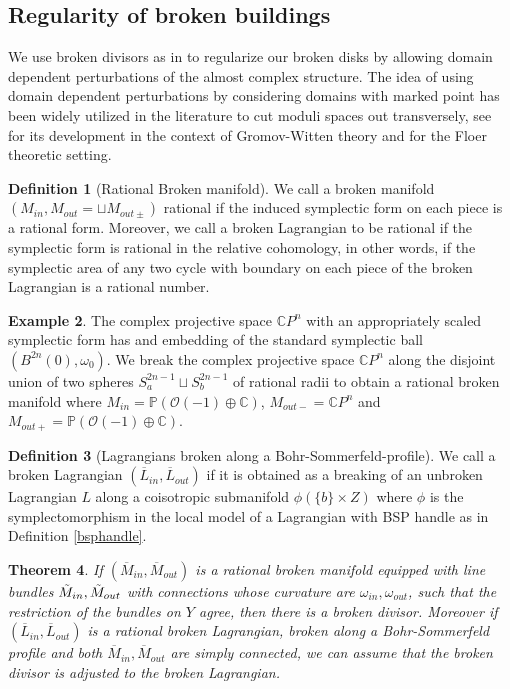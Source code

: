 \documentclass[11pt, oneside,dvipsnames]{amsart}
\newcommand{\<}{\langle}
\renewcommand{\>}{\rangle}
\newcommand{\inn}{{in}}
\newcommand{\out}{{out}}
\newcommand{\outp}{{out+}}
\newcommand{\outm}{{out-}}
\newcommand{\bC}{\mathbb{C}}
\newcommand{\bP}{\mathbb{P}}
\newcommand{\cO}{\mathcal{O}}
\newtheorem{Theorem}{Theorem}[section]
\theoremstyle{definition}
\theoremstyle{definition}
\newtheorem{defn}[Theorem]{Definition}
\newtheorem{example}[Theorem]{Example}
\numberwithin{equation}{subsection}
\begin{document}
\subsection{Regularity of broken buildings}\label{sub:reg}


We use broken divisors as in \cite{floflip} to regularize our broken disks by allowing domain dependent perturbations of the almost complex structure. The idea of using domain dependent perturbations by considering domains with marked point has been widely utilized in the literature to cut moduli spaces out transversely, see  \cite{cm07} for its development in the context of Gromov-Witten theory and \cite{cwstab} for the Floer theoretic setting.


\begin{defn}[Rational Broken manifold]
We call a broken manifold $(M_\inn,  M_\out = \sqcup M_{out\pm})$ rational if the induced symplectic form on each piece is a rational form.
Moreover, we call a broken Lagrangian to be rational if the symplectic form is rational in the relative cohomology, in other words, if the
symplectic area of any two cycle with boundary on each piece of the broken Lagrangian is a rational number.
\end{defn}

\begin{example}
    The complex projective space $\bC P^n$ with an appropriately scaled symplectic form has and embedding of the standard symplectic ball $(B^{2n}(0),\omega_0)$.
    We break the complex projective space $\bC P^n$ along the disjoint union of two spheres $S_a^{2n-1} \sqcup S_b^{2n-1}$ of rational radii to obtain 
    a rational broken manifold where $M_\inn = \bP(\cO(-1)\oplus \bC)$, $M_\outm = \bC P^n $ and $ M_\outp = \bP(\cO(-1)\oplus \bC)$.

\end{example}


\begin{defn}[Lagrangians broken along a Bohr-Sommerfeld-profile]
    We call a broken Lagrangian $(\overline{L}_\inn, \overline{L}_\out)$ if it is obtained as a breaking of an unbroken Lagrangian $L$ along a coisotropic submanifold $\phi( \{b\} \times Z)$ where $\phi$ is the symplectomorphism in the local model of a Lagrangian with BSP handle as in Definition \ref{bsphandle}.
\end{defn}


\begin{Theorem}\label{brokdiv}
If $(\overline{M}_\inn,\overline{M}_\out)$ is a rational broken manifold equipped with line bundles $\Tilde{M}_\inn,\Tilde{M}_\out$ with connections whose curvature are $\omega_\inn, \omega_\out$, such that the restriction of the bundles on $Y$ agree, then there is a broken divisor. Moreover if $(\overline{L}_\inn,\overline{L}_\out)$ is a rational broken 
Lagrangian, broken along a Bohr-Sommerfeld profile and both $\overline{M}_\inn,\overline{M}_\out$ are simply connected, we can assume that the broken divisor is adjusted to the broken Lagrangian.
\end{Theorem}
\end{document}
